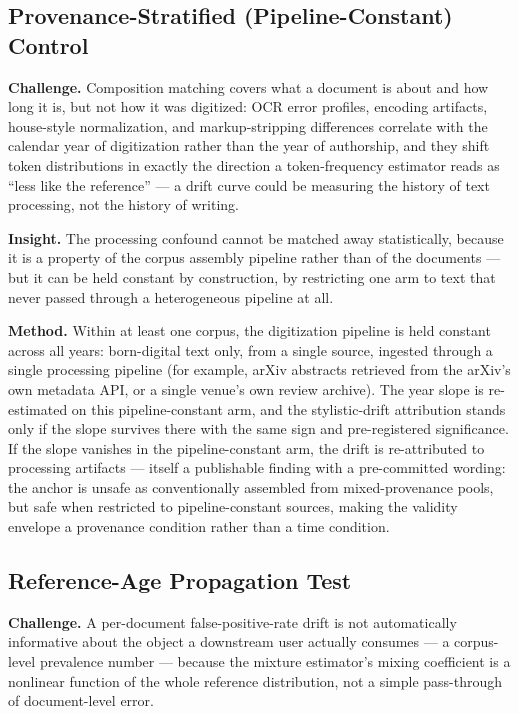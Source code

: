 \documentclass[conference]{IEEEtran}
\begin{document}
\subsection{Provenance-Stratified (Pipeline-Constant) Control}

\textbf{Challenge.} Composition matching covers what a document is about and how long it is, but not how it was digitized: OCR error profiles, encoding artifacts, house-style normalization, and markup-stripping differences correlate with the calendar year of digitization rather than the year of authorship, and they shift token distributions in exactly the direction a token-frequency estimator reads as ``less like the reference'' --- a drift curve could be measuring the history of text processing, not the history of writing.

\textbf{Insight.} The processing confound cannot be matched away statistically, because it is a property of the corpus assembly pipeline rather than of the documents --- but it can be held constant by construction, by restricting one arm to text that never passed through a heterogeneous pipeline at all.

\textbf{Method.} Within at least one corpus, the digitization pipeline is held constant across all years: born-digital text only, from a single source, ingested through a single processing pipeline (for example, arXiv abstracts retrieved from the arXiv's own metadata API, or a single venue's own review archive). The year slope is re-estimated on this pipeline-constant arm, and the stylistic-drift attribution stands only if the slope survives there with the same sign and pre-registered significance. If the slope vanishes in the pipeline-constant arm, the drift is re-attributed to processing artifacts --- itself a publishable finding with a pre-committed wording: the anchor is unsafe as conventionally assembled from mixed-provenance pools, but safe when restricted to pipeline-constant sources, making the validity envelope a provenance condition rather than a time condition.

\subsection{Reference-Age Propagation Test}

\textbf{Challenge.} A per-document false-positive-rate drift is not automatically informative about the object a downstream user actually consumes --- a corpus-level prevalence number --- because the mixture estimator's mixing coefficient is a nonlinear function of the whole reference distribution, not a simple pass-through of document-level error.
\end{document}
